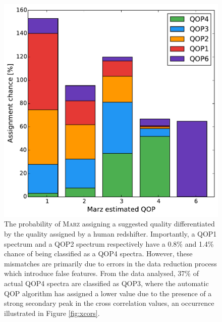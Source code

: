 \documentclass[5p]{elsarticle}
\newcommand{\marz}{\textsc{Marz}}
\begin{document}
\begin{figure}[h]
\centering
\includegraphics[width=\columnwidth]{autoqop.pdf}
\caption{The probability of \marz{} assigning a suggested quality differentiated by the quality assigned by a human redshifter. Importantly, a QOP1 spectrum and a QOP2 spectrum respectively have a 0.8\%  and 1.4\% chance of being classified as a QOP4 spectra. However, these mismatches are primarily due to errors in the data reduction process which introduce false features. From the data analysed, 37\% of actual QOP4 spectra are classified as QOP3, where the automatic QOP algorithm has assigned a lower value due to the presence of a strong secondary peak in the cross correlation values, an occurrence illustrated in Figure \ref{fig:xcors}.}
\label{fig:autoqop}
\end{figure}
\end{document}
